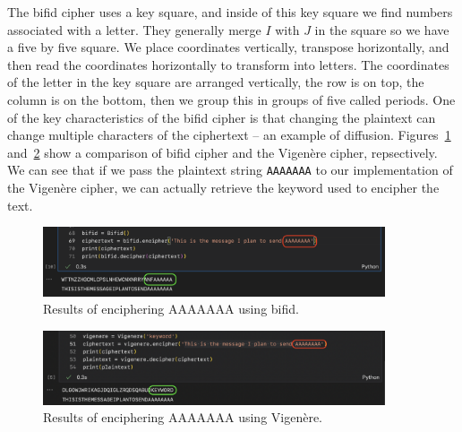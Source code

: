 \documentclass[12pt]{article}
\begin{document}
The bifid cipher uses a key square, and inside of this key square we find numbers associated with a letter. They generally merge \(I\) with \(J\) in the square so we have a five by five square. We place coordinates vertically, transpose horizontally, and then read the coordinates horizontally to transform into letters. The coordinates of the letter in the key square are arranged vertically, the row is on top, the column is on the bottom, then we group this in groups of five called periods. One of the key characteristics of the bifid cipher is that changing the plaintext can change multiple characters of the ciphertext -- an example of diffusion. Figures~\ref{fig:bifid} and~\ref*{fig:vignere2} show a comparison of bifid cipher and the Vigen\`ere cipher, repsectively. We can see that if we pass the plaintext string \texttt{AAAAAAA} to our implementation of the Vigen\`ere cipher, we can actually retrieve the keyword used to encipher the text.

\begin{figure}[!ht]
    \centering
    \includegraphics[width=0.90\textwidth]{figure03.png}
    \caption{Results of enciphering AAAAAAA using bifid.}
    \label{fig:bifid}
\end{figure}

\begin{figure}[!ht]
    \centering
    \includegraphics[width=0.9\textwidth]{figure04.png}
    \caption{Results of enciphering AAAAAAA using Vigen\`ere.}
    \label{fig:vignere2}
\end{figure}
\end{document}
